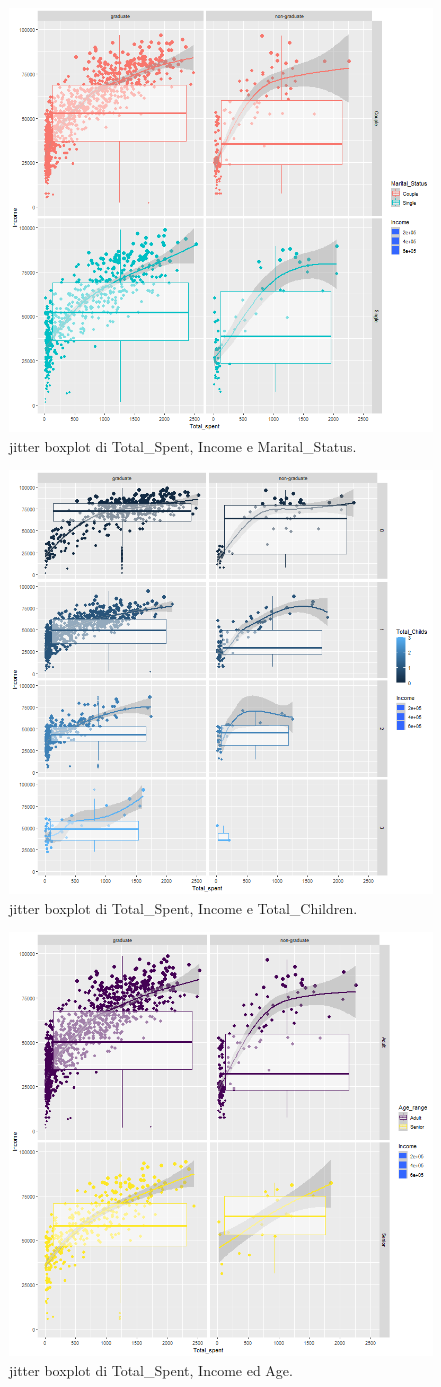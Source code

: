 \documentclass[letterpaper,11pt]{article}
\begin{document}
\begin{figure}[h!]
    \centering
    \includegraphics[width=.5\textwidth]{Img/EDA/EDA036.png}
    \caption{jitter boxplot di Total\_Spent, Income e Marital\_Status.}
\end{figure}



\begin{figure}[h!]
    \centering
    \includegraphics[width=.5\textwidth]{Img/EDA/EDA037.png}
    \caption{jitter boxplot di Total\_Spent, Income e Total\_Children.}
\end{figure}

\newpage



\begin{figure}[h!]
    \centering
    \includegraphics[width=.5\textwidth]{Img/EDA/EDA038.png}
    \caption{jitter boxplot di Total\_Spent, Income ed Age.}
\end{figure}
\end{document}
